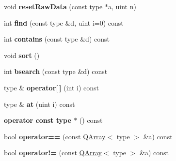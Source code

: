 \begin{DoxyCompactItemize}
\item 
\hypertarget{class_q_array_ae451da56cdb55dc86d397e5cd4f48179}{void {\bfseries reset\-Raw\-Data} (const type $\ast$a, uint n)}\label{class_q_array_ae451da56cdb55dc86d397e5cd4f48179}

\item 
\hypertarget{class_q_array_ab0d55e11c4acbe8a9a22334ecb3ceb43}{int {\bfseries find} (const type \&d, uint i=0) const }\label{class_q_array_ab0d55e11c4acbe8a9a22334ecb3ceb43}

\item 
\hypertarget{class_q_array_ad113f71205373da8335443aefcdb4178}{int {\bfseries contains} (const type \&d) const }\label{class_q_array_ad113f71205373da8335443aefcdb4178}

\item 
\hypertarget{class_q_array_a47fdc9eea42b6975cdc835bb2e08810e}{void {\bfseries sort} ()}\label{class_q_array_a47fdc9eea42b6975cdc835bb2e08810e}

\item 
\hypertarget{class_q_array_a10d9f12baa5ed1326df14537d2b609ca}{int {\bfseries bsearch} (const type \&d) const }\label{class_q_array_a10d9f12baa5ed1326df14537d2b609ca}

\item 
\hypertarget{class_q_array_a9c441db39679cea4ba8efbfe9e1464fa}{type \& {\bfseries operator\mbox{[}$\,$\mbox{]}} (int i) const }\label{class_q_array_a9c441db39679cea4ba8efbfe9e1464fa}

\item 
\hypertarget{class_q_array_afc77565990da93af524ca1287c5a1401}{type \& {\bfseries at} (uint i) const }\label{class_q_array_afc77565990da93af524ca1287c5a1401}

\item 
\hypertarget{class_q_array_a16369c32eef0c8891179e985a9077dfc}{{\bfseries operator const type $\ast$} () const }\label{class_q_array_a16369c32eef0c8891179e985a9077dfc}

\item 
\hypertarget{class_q_array_ac25f4c97616f3f858e2c3e4d8fa54847}{bool {\bfseries operator==} (const \hyperlink{class_q_array}{Q\-Array}$<$ type $>$ \&a) const }\label{class_q_array_ac25f4c97616f3f858e2c3e4d8fa54847}

\item 
\hypertarget{class_q_array_a8265a7eaa9b4d5e9b3cd73908e36fa13}{bool {\bfseries operator!=} (const \hyperlink{class_q_array}{Q\-Array}$<$ type $>$ \&a) const }\label{class_q_array_a8265a7eaa9b4d5e9b3cd73908e36fa13}


\end{DoxyCompactItemize}
